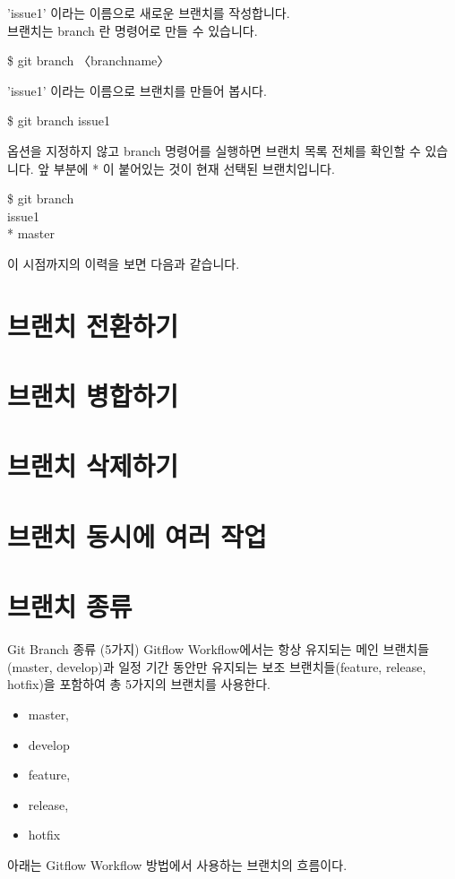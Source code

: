 \documentclass[12pt, a4paper, oneside]{book}
\let\stdsection\section
\renewcommand\section{\newpage\stdsection}
\begin{document}
		'issue1' 이라는 이름으로 새로운 브랜치를 작성합니다.\\
		브랜치는 branch 란 명령어로 만들 수 있습니다.

		\begin{tcolorbox}
		\$ git branch 〈branchname〉
		\end{tcolorbox}


'issue1' 이라는 이름으로 브랜치를 만들어 봅시다.

		\begin{tcolorbox}
		\$ git branch issue1
		\end{tcolorbox}

옵션을 지정하지 않고 branch 명령어를 실행하면 브랜치 목록 전체를 확인할 수 있습니다. 앞 부분에 * 이 붙어있는 것이 현재 선택된 브랜치입니다.
		\begin{tcolorbox}
		\$ git branch  \\
		  issue1  \\
		* master  
		\end{tcolorbox}

이 시점까지의 이력을 보면 다음과 같습니다.






	\section{브랜치 전환하기 }
	\section{브랜치 병합하기 }
	\section{브랜치 삭제하기 }
	\section{브랜치 동시에 여러 작업 }
	\section{브랜치 종류 }


Git Branch 종류 (5가지)
Gitflow Workflow에서는 항상 유지되는 메인 브랜치들(master, develop)과 
일정 기간 동안만 유지되는 보조 브랜치들(feature, release, hotfix)을 포함하여 총 5가지의 브랜치를 사용한다.

			\begin{itemize}	[	
							topsep=0.0em,
							itemsep=0.0em,
							leftmargin=6em, 
							labelsep=3em 
							]
				\item	master,
				\item	develop
				\item	feature, 
				\item	release, 
				\item	hotfix
			\end{itemize}
아래는 Gitflow Workflow 방법에서 사용하는 브랜치의 흐름이다.
\end{document}
